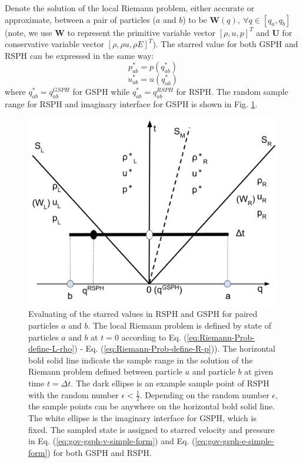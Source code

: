 Denote the solution of the local Riemann problem, either accurate or approximate, between a pair of particles ($a$ and $b$) to be $\textbf{W} (q), \  \forall q \in [q_a, q_b]$ (note, we use $\textbf{W}$ to represent the primitive variable vector $[\rho, u, p]^T$ and $\textbf{U}$ for conservative variable vector  $[\rho, \rho u, \rho E]^T$). The starred value for both GSPH and RSPH can be expressed in the same way:
\begin{equation}
p_{ab}^{\ast} = p \left(q_{ab}^{\ast} \right)
\label{eq:RSPH-Random-Pick-p}
\end{equation}
\begin{equation}
u_{ab}^{\ast} = u \left(q_{ab}^{\ast} \right)
\label{eq:RSPH-Random-Pick-u}
\end{equation}
where $q_{ab}^{\ast}=q_{ab}^{GSPH}$ for GSPH while $q_{ab}^{\ast}=q_{ab}^{RSPH}$ for RSPH. The random sample range for RSPH and imaginary interface for GSPH is shown in Fig. \ref{fig:pick-up-state-GSPH-RSPH}.
\begin{figure}
    \center
	\includegraphics[width=0.5 \textwidth]{Chapter-4/Figures/RSPH-GSPH}
    \caption{Evaluating of the starred values in RSPH and GSPH for paired particles $a$ and $b$. The local Riemann problem is defined by state of particles $a$ and $b$ at $t=0$ according to Eq. (\ref{eq:Riemann-Prob-define-L-rho}) - Eq. (\ref{eq:Riemann-Prob-define-R-p})). The horizontal bold solid line indicate the sample range in the solution of the Riemann problem defined between particle $a$ and particle $b$ at given time $t=\Delta t$. The dark ellipse is an example sample point of RSPH with the random number $\epsilon < \frac{1}{2}$. Depending on the random number $\epsilon$, the sample points can be anywhere on the horizontal bold solid line. The white ellipse is the imaginary interface for GSPH, which is fixed. The sampled state is assigned to starred velocity and pressure in Eq. (\ref{eq:gov-gsph-v-simple-form}) and Eq. (\ref{eq:gov-gsph-e-simple-form}) for both GSPH and RSPH.}
    \label{fig:pick-up-state-GSPH-RSPH}
\end{figure}

